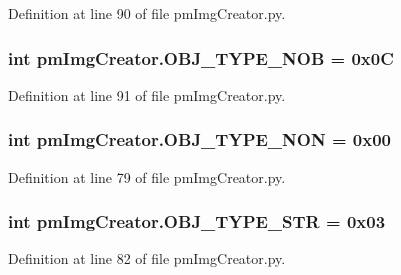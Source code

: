 Definition at line 90 of file pm\-Img\-Creator.\-py.

\hypertarget{namespacepm_img_creator_a62d2969e7126ef687503c25e14ad638a}{
\subsubsection[{O\-B\-J\-\_\-\-T\-Y\-P\-E\-\_\-\-N\-O\-B}]{\setlength{\rightskip}{0pt plus 5cm}int pm\-Img\-Creator.\-O\-B\-J\-\_\-\-T\-Y\-P\-E\-\_\-\-N\-O\-B = 0x0\-C}}\label{namespacepm_img_creator_a62d2969e7126ef687503c25e14ad638a}


Definition at line 91 of file pm\-Img\-Creator.\-py.

\hypertarget{namespacepm_img_creator_ad6ecd60a9bf604250f5bb112f49774ee}{
\subsubsection[{O\-B\-J\-\_\-\-T\-Y\-P\-E\-\_\-\-N\-O\-N}]{\setlength{\rightskip}{0pt plus 5cm}int pm\-Img\-Creator.\-O\-B\-J\-\_\-\-T\-Y\-P\-E\-\_\-\-N\-O\-N = 0x00}}\label{namespacepm_img_creator_ad6ecd60a9bf604250f5bb112f49774ee}


Definition at line 79 of file pm\-Img\-Creator.\-py.

\hypertarget{namespacepm_img_creator_a1cbddb270279fce34c8984eaa59bb994}{
\subsubsection[{O\-B\-J\-\_\-\-T\-Y\-P\-E\-\_\-\-S\-T\-R}]{\setlength{\rightskip}{0pt plus 5cm}int pm\-Img\-Creator.\-O\-B\-J\-\_\-\-T\-Y\-P\-E\-\_\-\-S\-T\-R = 0x03}}\label{namespacepm_img_creator_a1cbddb270279fce34c8984eaa59bb994}


Definition at line 82 of file pm\-Img\-Creator.\-py.

